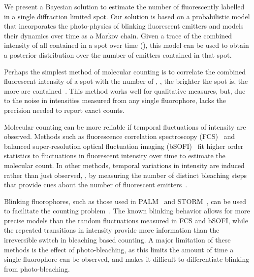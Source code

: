 %
We present a Bayesian solution to estimate the number of fluorescently labelled
\smallobjects in a single diffraction limited spot.
  Our solution is based on a probabilistic model that incorporates the
  photo-physics of blinking fluorescent emitters and models their dynamics over
  time as a Markov chain.
  Given a trace of the combined intensity of all \smallobjects contained in a
  spot over time (), this model can be used to obtain a posterior distribution
  over the number of emitters contained in that spot.

%
%


%
Perhaps the simplest method of molecular counting is to correlate the combined
fluorescent intensity of a spot with the number of \smallobjects, \ie, the
brighter the spot is, the more \smallobjects are contained~\citep{schmied_2012,
tolar_2005}.
  This method works well for qualitative measures, but, due to the noise in
  intensities measured from any single fluorophore, lacks the precision needed
  to report exact counts.

%
Molecular counting can be more reliable if temporal fluctuations of intensity
are observed.
  Methods such as fluorescence correlation spectroscopy
  (FCS)~\citep{otsuka_2023,wachsmuth_2015,politi_2018} and balanced
  super-resolution optical fluctuation imaging
  (bSOFI)~\citep{geissbuehler_2012} fit higher order statistics to fluctuations
  in fluorescent intensity over time to estimate the molecular count.
  In other methods, temporal variations in intensity are induced rather than
  just observed, \eg, by measuring the number of distinct bleaching
  steps that provide cues about the number of fluorescent
  emitters~\citep{ulbrich_2007,jain_2011,hummert_2021}.

%
Blinking fluorophores, such as those used in
PALM~\citep{sengupta_pcPALM_2011,lee_counting_2012} and
STORM~\citep{patel_blinking_2021}, can be used to facilitate the counting
problem~\citep{rollins_stochastic_2015,nino_2017}.
  The known blinking behavior allows for more precise models than the random
  fluctuations measured in FCS and bSOFI, while the repeated transitions in
  intensity provide more information than the irreversible switch in bleaching
  based counting.
  A major limitation of these methods is the effect of photo-bleaching, as this
  limits the amount of time a single fluorophore can be observed, and makes it
  difficult to differentiate blinking from photo-bleaching.


